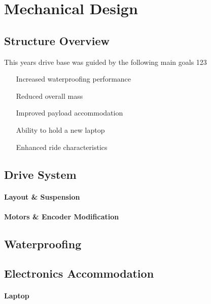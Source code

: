 \section{Mechanical Design}

\subsection{Structure Overview}
This years drive base was guided by the following main goals
123

\begin{itemize}
\item[Increased waterproofing performance]
\item[Reduced overall mass]
\item[Improved payload accommodation]
\item[Ability to hold a new laptop]
\item[Enhanced ride characteristics]
\end{itemize}

\subsection{Drive System}
\paragraph{Layout \& Suspension}

\paragraph{Motors \& Encoder Modification}

\subsection{Waterproofing}

\subsection{Electronics Accommodation}
\paragraph{Laptop}

